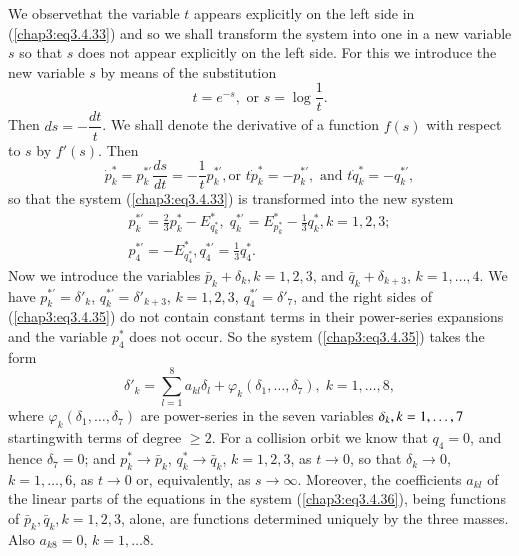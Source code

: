 We observe\pageoriginale that the variable $t$ appears explicitly on
the left side in (\ref{chap3:eq3.4.33}) and so we shall transform the
system into one in a new variable $s$ so that $s$ does not appear
explicitly on the left side. For this we introduce the new variable
$s$ by means of the substitution 
\begin{equation*}
t = e^{-s}, \text{ or } s = \log
\frac{1}{t}. \tag{3.4.34}\label{chap3:eq3.4.34} 
\end{equation*}
Then $ds = - \dfrac{dt}{t}$. We shall denote the derivative of a
function $f(s)$ with respect to $s$ by $f'(s)$. Then 
$$
\dot{p}^*_k = p^{*'}_k \frac{ds}{dt} = - \frac{1}{t} p^{*'}_k, \text{
  or } t \dot{p}^*_k  = - p^{*'}_k, \text{ and } t \dot{q}^*_k = -
q^{*'}_k,  
$$
so that the system (\ref{chap3:eq3.4.33}) is transformed into the new
system 
\begin{gather*} 
p^{*'}_k = \frac{2}{3} p^*_k - E^*_{q^*_k}, \; q^{*'}_k = E^*_{p^*_k}
-\frac{1}{3} q^*_k, k = 1,2,3; \\ 
p^{*'}_4 = - E^*_{q^*_4} , q^{*'}_4  = \frac{1}{3} q^*_4.
\tag{3.4.35}\label{chap3:eq3.4.35} 
\end{gather*}
Now we introduce the variables $\bar{p}_k + \delta_k, k = 1,2,3$, and
$\bar{q}_k + \delta_{k+3}$, $k =1, \ldots, 4$. We have $p^{*'}_k =
\delta'_k$, $q^{*'}_k = \delta'_{k+3}$,  
$k = 1,2,3$, $q^{*'}_4 = \delta'_7$, and the right sides of
(\ref{chap3:eq3.4.35}) do not contain constant terms in their
power-series expansions and the variable $p^*_4$ does not occur. So
the system (\ref{chap3:eq3.4.35}) takes the form 
\begin{equation*}
\delta'_k = \sum\limits^8_{l=1} a_{kl} \delta_l + \varphi_k (\delta_1,
\ldots, \delta_7), \; k = 1,\ldots, 8,
\tag{3.4.36}\label{chap3:eq3.4.36} 
\end{equation*}
where $\varphi_k(\delta_1, \ldots, \delta_7)$ are power-series in the
seven variables $\delta_k, k = 1,\break \ldots, 7$
starting\pageoriginale with terms of degree $\geq 2$. For a collision
orbit we know that $q_4 = 0$, and hence $\delta_7 = 0$; and $p^*_k \to
\bar{p}_k$, $q^*_k \to \bar{q}_k$, $k = 1,2,3$, as $t \to 0$, so that
$\delta_k \to 0$, $k = 1, \ldots, 6$, as $t \to 0$ or, equivalently,
as $s \to \infty$. Moreover, the coefficients $a_{kl}$ of the linear
parts of the equations in the system (\ref{chap3:eq3.4.36}), being
functions of $\bar{p}_k, \bar{q}_k, k =1,2,3$, alone, are functions
determined uniquely by the three masses. Also $a_{k8} = 0$, $k =1,
\ldots 8$. 

